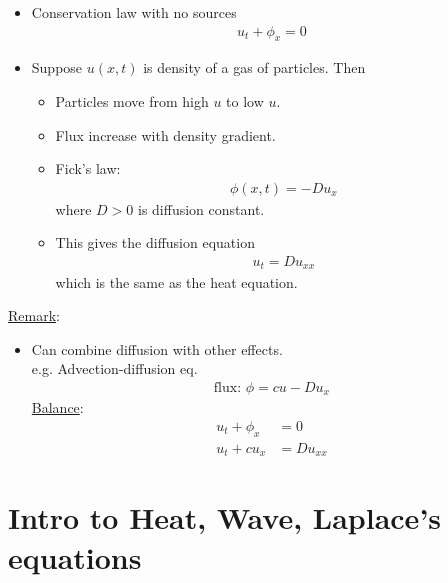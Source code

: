 \documentclass[12pt, letterpaper]{article}
\begin{document}
\begin{itemize}
    \item Conservation law with no sources \begin{align*}
        u_t + \phi_x = 0
    \end{align*}
    \item Suppose $u(x,t)$ is density of a gas of particles. Then
    \begin{itemize}
        \item Particles move from high $u$ to low $u$.
        \item Flux increase with density gradient.
        \item Fick's law: 
        \begin{align*}
            \phi(x,t) = -Du_x
        \end{align*}
        where $D>0$ is diffusion constant.
        \item This gives the diffusion equation
        \begin{align*}
            u_t = Du_{xx}
        \end{align*}
        which is the same as the heat equation.
    \end{itemize}
\end{itemize}
\underline{Remark}:
\begin{itemize}
    \item Can combine diffusion with other effects. \\
    e.g. Advection-diffusion eq.
    \begin{align*}
        \text{flux: } \phi = cu - Du_x
    \end{align*}
    \underline{Balance}: 
    \begin{align*}
        u_t + \phi_x &= 0 \\
        u_t + cu_x &= Du_{xx}
    \end{align*}
\end{itemize}

\section{Intro to Heat, Wave, Laplace's equations}
\end{document}
